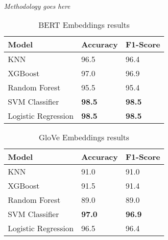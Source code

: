 \textit{Methodology goes here}

\begin{table}[hbt!]
\begin{threeparttable}
\caption{BERT Embeddings results}
\label{bert_embeddings_results}
\begin{tabular}{lll}
\toprule
\headrow Model & Accuracy & F1-Score\\
\midrule
KNN & 96.5 & 96.4\\ 
XGBoost & 97.0 & 96.9\\ 
Random Forest & 95.5 & 95.4\\ 
SVM Classifier & \textbf{98.5} & \textbf{98.5}\\ 
Logistic Regression & \textbf{98.5} & \textbf{98.5}\\ 
\bottomrule
\end{tabular}
\end{threeparttable}
\end{table}

\begin{table}[hbt!]
\begin{threeparttable}
\caption{GloVe Embeddings results}
\label{glove_embeddings_results}
\begin{tabular}{lll}
\toprule
\headrow Model & Accuracy & F1-Score\\
\midrule
KNN & 91.0 & 91.0 \\ 
XGBoost & 91.5 & 91.4 \\ 
Random Forest & 89.0 & 89.0 \\ 
SVM Classifier & \textbf{97.0} & \textbf{96.9} \\ 
Logistic Regression & 96.5 & 96.4 \\ 
\bottomrule
\end{tabular}
\end{threeparttable}
\end{table}



